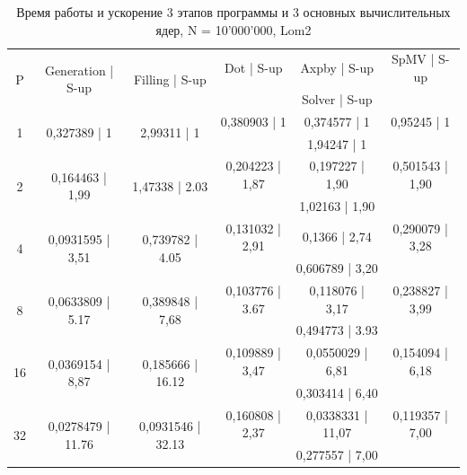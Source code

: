 		\begin{table}[H]
			\begin{tabular}{|c||c|c|c|c|c|}
				\hline
\multirow{2}{*}{P} &  \multirow{2}{*}{Generation | S-up} & \multirow{2}{*}{Filling | S-up} & Dot | S-up & Axpby | S-up & SpMV | S-up \\ \cline{4-6}
                   &                              &                         & \multicolumn{3}{c|}{Solver | S-up} \\ \hline
\multirow{2}{*}{1} & \multirow{2}{*}{0,327389 | 1} & \multirow{2}{*}{2,99311 | 1} & 0,380903 | 1 & 0,374577 | 1 & 0,95245 | 1 \\ \cline{4-6}
                   &                   &                   & \multicolumn{3}{c|}{1,94247 | 1}   \\ \hline
\multirow{2}{*}{2} & \multirow{2}{*}{0,164463 | 1,99} & \multirow{2}{*}{1,47338 | 2.03} & 0,204223 | 1,87 & 0,197227 | 1,90& 0,501543 | 1,90 \\ \cline{4-6}
                   &                   &                   & \multicolumn{3}{c|}{1,02163 | 1,90}   \\ \hline
\multirow{2}{*}{4} & \multirow{2}{*}{0,0931595 | 3,51} & \multirow{2}{*}{0,739782 | 4.05} & 0,131032 | 2,91& 0,1366 | 2,74& 0,290079 | 3,28 \\ \cline{4-6}
                   &                   &                   & \multicolumn{3}{c|}{0,606789 | 3,20}   \\ \hline
\multirow{2}{*}{8} & \multirow{2}{*}{0,0633809 | 5.17} & \multirow{2}{*}{0,389848 | 7,68} & 0,103776 | 3.67& 0,118076 | 3,17& 0,238827 | 3,99\\ \cline{4-6}
                   &                   &                   & \multicolumn{3}{c|}{0,494773 | 3.93}   \\ \hline
\multirow{2}{*}{16} & \multirow{2}{*}{0,0369154 | 8,87} & \multirow{2}{*}{0,185666 | 16.12} & 0,109889 | 3,47& 0,0550029 | 6,81& 0,154094 | 6,18\\ \cline{4-6}
                   &                   &                   & \multicolumn{3}{c|}{0,303414 | 6,40}   \\ \hline
\multirow{2}{*}{32} & \multirow{2}{*}{0,0278479 | 11.76} & \multirow{2}{*}{0,0931546 | 32.13} & 0,160808 | 2,37& 0,0338331 | 11,07& 0,119357 | 7,00\\ \cline{4-6}
                   &                   &                   & \multicolumn{3}{c|}{0,277557 | 7,00}   \\ \hline
			\end{tabular}
			\caption{Время работы и ускорение 3 этапов программы и 3 основных вычислительных ядер, N = 10'000'000, Lom2}
			\label{par_2}
		\end{table}
